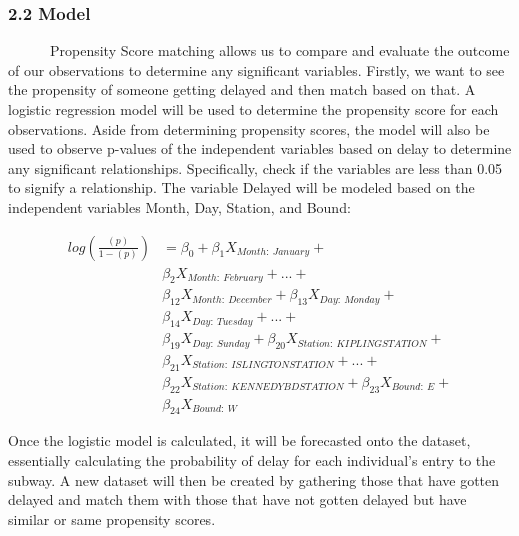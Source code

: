 \documentclass[
]{article}
\begin{document}
\hypertarget{model}{%
\subsubsection{2.2 Model}\label{model}}

~~~~~~Propensity Score matching allows us to compare and evaluate the
outcome of our observations to determine any significant variables.
Firstly, we want to see the propensity of someone getting delayed and
then match based on that. A logistic regression model will be used to
determine the propensity score for each observations. Aside from
determining propensity scores, the model will also be used to observe
p-values of the independent variables based on delay to determine any
significant relationships. Specifically, check if the variables are less
than 0.05 to signify a relationship. The variable Delayed will be
modeled based on the independent variables Month, Day, Station, and
Bound:

\begin{align*}
log(\frac{(p)}{1-(p)}) &= {\beta}_0 + 
                            {\beta}_1X_{Month:\ January} + \\
                        &    {\beta}_2X_{Month:\ February} +
                            ... + \\
                        &    {\beta}_12X_{Month:\ December} + 
                            {\beta}_13X_{Day:\ Monday} + \\
                        &   {\beta}_14X_{Day:\ Tuesday} + 
                            ... + \\
                        &    {\beta}_19X_{Day:\ Sunday} + 
                            {\beta}_20X_{Station:\ KIPLING STATION} + \\
                        &   {\beta}_21X_{Station:\ ISLINGTON STATION} + 
                            ... + \\
                        &    {\beta}_{22}X_{Station:\ KENNEDY BD STATION} + 
                            {\beta}_{23}X_{Bound:\ E} + \\
                        &    {\beta}_{24}X_{Bound:\ W}
\end{align*}

Once the logistic model is calculated, it will be forecasted onto the
dataset, essentially calculating the probability of delay for each
individual's entry to the subway. A new dataset will then be created by
gathering those that have gotten delayed and match them with those that
have not gotten delayed but have similar or same propensity scores.
\end{document}
